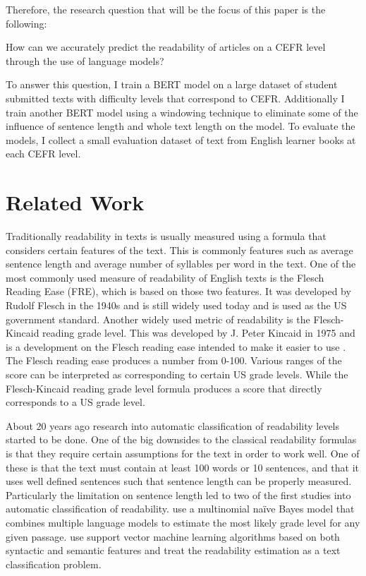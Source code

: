 \documentclass[11pt,a4paper]{article}
\begin{document}
\noindent
Therefore, the research question that will be the focus of this paper is the
following:

\begin{displayquote}
  How can we accurately predict the readability of articles on a CEFR level
  through the use of language models?
\end{displayquote}

\noindent
To answer this question, I train a BERT model on a large dataset of student
submitted texts with difficulty levels that correspond to CEFR. Additionally I
train another BERT model using a windowing technique to eliminate some of the
influence of sentence length and whole text length on the model. To evaluate
the models, I collect a small evaluation dataset of text from English learner
books at each CEFR level.

\section{Related Work}

Traditionally readability in texts is usually measured using a formula that
considers certain features of the text. This is commonly features such as
average sentence length and average number of syllables per word in the text.
One of the most commonly used measure of readability of English texts is the
Flesch Reading Ease (FRE), which is based on those two features. It was developed by
Rudolf Flesch in the 1940s and is still widely used today and is used as the US
government standard. Another widely used metric of readability is the Flesch-Kincaid reading grade level. This was
developed by J. Peter Kincaid in 1975 and is a development on the Flesch
reading ease intended to make it easier to use \parencite{Kincaid1975DerivationON}. The Flesch reading ease
produces a number from 0-100. Various ranges of the score can be interpreted as
corresponding to certain US grade levels. While the Flesch-Kincaid reading
grade level formula produces a score that directly corresponds to a US grade
level.

About 20 years ago research into automatic classification of readability levels
started to be done. One of the big downsides to the classical readability
formulas is that they require certain assumptions for the text in order to work
well. One of these is that the text must contain at least 100 words or 10
sentences, and that it uses well defined sentences such that sentence length
can be properly measured. Particularly the limitation on sentence length led to
two of the first studies into automatic classification of readability.
\parencite{collins-thompson-callan-2004-language}
use a multinomial naïve Bayes model that combines multiple language models to
estimate the most likely grade level for any given passage.
\parencite{10.1145/1008992.1009114} use support vector machine learning algorithms
based on both syntactic and semantic features and treat the readability
estimation as a text classification problem.
\end{document}

